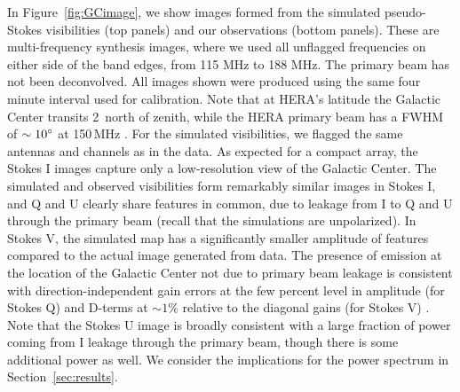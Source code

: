 \documentclass[twocolumn, trackchanges]{aastex61}
\begin{document}
In Figure~\ref{fig:GCimage}, we show images formed from the simulated
pseudo-Stokes visibilities (top panels) and our observations (bottom panels).
These are multi-frequency synthesis images, where we used all unflagged
frequencies on either side of the band edges, from 115 MHz to 188 MHz.  The
primary beam has not been deconvolved.  All images shown were produced using the
same four minute interval used for calibration.  Note that at HERA's latitude
the Galactic Center transits 2\arcdeg\ north of zenith, while the HERA primary
beam has a FWHM of $\sim10\mbox{$^\circ$}$ at 150\,MHz \citep{Neben.16}. For the
simulated visibilities, we flagged the same antennas and channels as in the
data. As expected for a compact array, the Stokes I images capture only a
low-resolution view of the Galactic Center. The simulated and observed
visibilities form remarkably similar images in Stokes I, and Q and U clearly
share features in common, due to leakage from I to Q and U through the primary
beam (recall that the simulations are unpolarized).  In Stokes V, the simulated
map has a significantly smaller amplitude of features compared to the actual
image generated from data.  The presence of emission at the location of the
Galactic Center not due to primary beam leakage is consistent with
direction-independent gain errors at the few percent level in amplitude (for
Stokes Q) and D-terms at $\sim 1\%$ relative to the diagonal gains (for Stokes
V) \citep{TMS}.  Note that the Stokes U image is broadly consistent with a large
fraction of power coming from I leakage through the primary beam, though there
is some additional power as well.  We consider the implications for the power
spectrum in Section~\ref{sec:results}.
\end{document}
